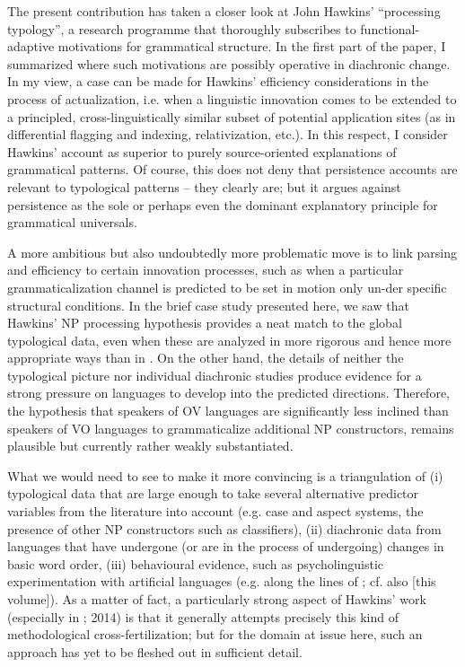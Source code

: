 \documentclass[output=paper]{langsci/langscibook}
\begin{document}
The present contribution has taken a closer look at John Hawkins’ “processing typology”, a research programme that thoroughly subscribes to functional-adaptive motivations for grammatical structure. In the first part of the paper, I summarized where such motivations are possibly operative in diachronic change. In my view, a case can be made for Hawkins’ efficiency considerations in the process of actualization, i.e. when a linguistic innovation comes to be extended to a principled, cross-linguistically similar subset of potential application sites (as in differential flagging and indexing, relativization, etc.). In this respect, I consider Hawkins’ account as superior to purely source-oriented explanations of grammatical patterns. Of course, this does not deny that persistence accounts are relevant to typological patterns – they clearly are; but it argues against persistence as the sole or perhaps even the dominant explanatory principle for grammatical universals.

A more ambitious but also undoubtedly more problematic move is to link parsing and efficiency to certain innovation processes, such as when a particular grammaticalization channel is predicted to be set in motion only un-der specific structural conditions. In the brief case study presented here, we saw that Hawkins’ NP processing hypothesis provides a neat match to the global typological data, even when these are analyzed in more rigorous and hence more appropriate ways than in \citet{Hawkins2014}. On the other hand, the details of neither the typological picture nor individual diachronic studies produce evidence for a strong pressure on languages to develop into the predicted directions. Therefore, the hypothesis that speakers of OV languages are significantly less inclined than speakers of VO languages to grammaticalize additional NP constructors, remains plausible but currently rather weakly substantiated. 

What we would need to see to make it more convincing is a triangulation of (i) typological data that are large enough to take several alternative predictor variables from the literature into account (e.g. case and aspect systems, the presence of other NP constructors such as classifiers), (ii) diachronic data from languages that have undergone (or are in the process of undergoing) changes in basic word order, (iii) behavioural evidence, such as psycholinguistic experimentation with artificial languages (e.g. along the lines of \citealt{CulbertsonEtAl2012}; cf. also \citealt{Levshina2018} [this volume]). As a matter of fact, a particularly strong aspect of Hawkins’ work (especially in \citealt{Hawkins2004}; 2014) is that it generally attempts precisely this kind of methodological cross-fertilization; but for the domain at issue here, such an approach has yet to be fleshed out in sufficient detail.
\end{document}
